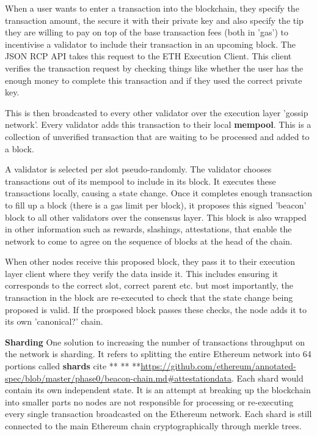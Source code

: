 When a user wants to enter a transaction into the blockchain, they specify the transaction amount, the secure it with their private key and also specify the tip they are willing to pay on top of the base transaction fees (both in 'gas') to incentivise a validator to include their transaction in an upcoming block. The JSON RCP API takes this request to the ETH Execution Client. This client verifies the transaction request by checking things like whether the user has the enough money to complete this transaction and if they used the correct private key. \cite{EthereumEthereum.org} 

This is then broadcasted to every other validator over the execution layer 'gossip network'. Every validator adds this transaction to their local \textbf{mempool}. This is a collection of unverified transaction that are waiting to be processed and added to a block.

A validator is selected per slot pseudo-randomly. The validator chooses transactions out of its mempool to include in its block. It executes these transactions locally, causing a state change. Once it completes enough transaction to fill up a block (there is a gas limit per block), it proposes this signed 'beacon' block to all other validators over the consensus layer. This block is also wrapped in other information such as rewards, slashings, attestations, that enable the network to come to agree on the sequence of blocks at the head of the chain.

When other nodes receive this proposed block, they pass it to their execution layer client where they verify the data inside it. This includes ensuring it corresponds to the correct slot, correct parent etc. but most importantly, the transaction in the block are re-executed to check that the state change being proposed is valid. If the prosposed block passes these checks, the node adds it to its own 'canonical?' chain.  \cite{EthereumEthereum.org} 


\textbf{Sharding}
One solution to increasing the number of transactions throughput on the network is sharding. It refers to splitting the entire Ethereum network into 64 portions called \textbf{shards} cite ** ** **\url{https://github.com/ethereum/annotated-spec/blob/master/phase0/beacon-chain.md#attestationdata}. Each shard would contain its own independent state. It is an attempt at breaking up the blockchain into smaller parts no nodes are not responsible for processing or re-executing every single transaction broadcasted on the Ethereum network. Each shard is still connected to the main Ethereum chain cryptographically through merkle trees. \cite{EthereumEthereum.org} 


